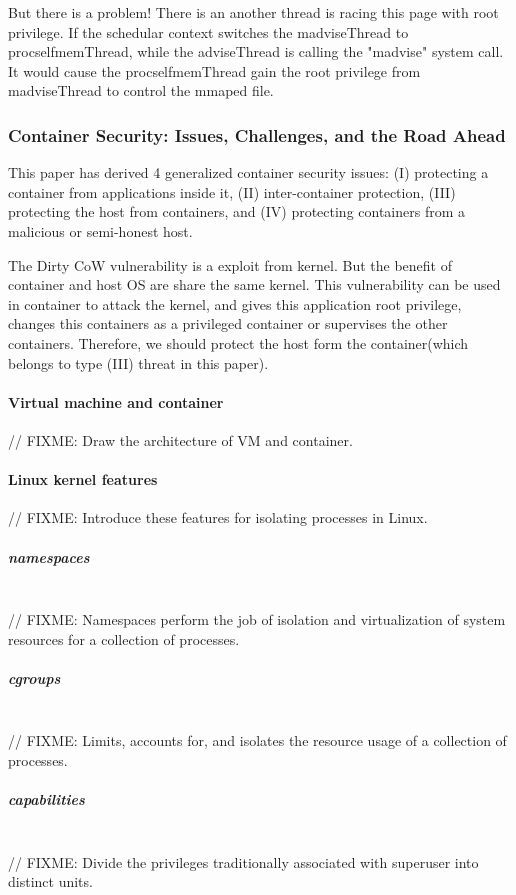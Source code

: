 \documentclass[12pt,a4paper,oneside]{IEEEconf}
\begin{document}
But there is a problem! There is an another thread is racing this page with root privilege.
If the schedular context switches the madviseThread to procselfmemThread, while the
adviseThread is calling the "madvise" system call. It would cause the procselfmemThread
gain the root privilege from madviseThread to control the mmaped file.

\subsubsection{Container Security: Issues, Challenges, and the Road Ahead}
This paper\cite{Road_Ahead} has derived 4 generalized container security issues:
(\RN{1}) protecting a container from applications inside it, (\RN{2}) inter-container
protection, (\RN{3}) protecting the host from containers, and (\RN{4}) protecting containers
from a malicious or semi-honest host.\cite{Road_Ahead}

The Dirty CoW vulnerability is a exploit from kernel. But the benefit
of container and host OS are share the same kernel. This vulnerability can be used in
container to attack the kernel, and gives this application root privilege, changes this
containers as a privileged container or supervises the other containers. Therefore, we should
protect the host form the container(which belongs to type (\RN{3}) threat in this paper).

\paragraph{Virtual machine and container}
// FIXME: Draw the architecture of VM and container.

\paragraph{Linux kernel features}
// FIXME: Introduce these features for isolating processes in Linux.

\subparagraph{namespaces}\mbox{}\\
// FIXME: Namespaces perform the job of isolation and virtualization of system resources
for a collection of processes.\cite{Road_Ahead}

\subparagraph{cgroups}\mbox{}\\
// FIXME: Limits, accounts for, and isolates the resource usage of a collection of processes.
\cite{cgroup_wiki}

\subparagraph{capabilities}\mbox{}\\
// FIXME: Divide the privileges traditionally associated with superuser into distinct
units.
\end{document}
